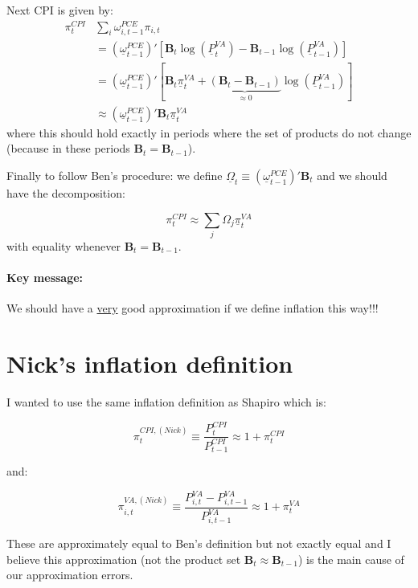 \documentclass[12pt,english]{article}
\begin{document}
Next CPI is given by:
\begin{align*}
	\pi_t^{CPI} &\sum_i \omega_{i,t-1}^{PCE} \pi_{i,t}\\
		&= (\underline{\omega}_{t-1}^{PCE})' \left[\mathbold{B}_t\log(\underline{P}_{t}^{VA}) - \mathbold{B}_{t-1}\log(\underline{P}_{t-1}^{VA})\right] \\
		&=(\underline{\omega}_{t-1}^{PCE})' \left[\mathbold{B}_t \underline{\pi}_{t}^{VA} +\underbrace{(\mathbold{B}_t - \mathbold{B}_{t-1})}_{\approx 0}\log(\underline{P}_{t-1}^{VA})\right]\\
		&\approx (\underline{\omega}_{t-1}^{PCE})'\mathbold{B}_t \underline{\pi}_{t}^{VA}
\end{align*}
where this should hold exactly in periods where the set of products do not change (because in these periods $\mathbold{B}_t = \mathbold{B}_{t-1}$).

Finally to follow Ben's procedure: we define $\underline{\Omega}_t\equiv (\underline{\omega}_{t-1}^{PCE})'\mathbold{B}_t$ and we should have the decomposition:

\[
	\pi_{t}^{CPI} \approx \sum_j \Omega_j \underline{\pi}_{t}^{VA}
\]
with equality whenever $\mathbold{B}_t = \mathbold{B}_{t-1}$.

\paragraph{Key message:} We should have a \underline{very} good approximation if we define inflation this way!!!

\section{Nick's inflation definition}

I wanted to use the same inflation definition as Shapiro which is:

\[
	\pi_{t}^{CPI,(Nick)}\equiv \frac{P_{t}^{CPI}}{P_{t-1}^{CPI}}\approx 1+ \pi_t^{CPI}
\]

and:

\[
	\pi_{i,t}^{VA,(Nick)}\equiv \frac{P_{i,t}^{VA} - P_{i,t-1}^{VA}}{P_{i,t-1}^{VA}}\approx 1+ \pi_t^{VA}
\]

These are approximately equal to Ben's definition but not exactly equal and I believe this approximation (not the product set $\mathbold{B}_t\approx \mathbold{B}_{t-1}$) is the main cause of our approximation errors. 
\end{document}
